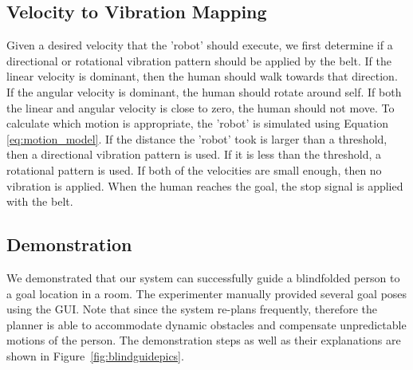 \subsection{Velocity to Vibration Mapping}

Given a desired velocity that the 'robot' should execute, we first determine if a directional or rotational vibration pattern should be applied by the belt. If the linear velocity is dominant, then the human should walk towards that direction. If the angular velocity is dominant, the human should rotate around self. If both the linear and angular velocity is close to zero, the human should not move. To calculate which motion is appropriate, the 'robot' is simulated using Equation \ref{eq:motion_model}. If the distance the 'robot' took is larger than a threshold, then a directional vibration pattern is used. If it is less than the threshold, a rotational pattern is used. If both of the velocities are small enough, then no vibration is applied. When the human reaches the goal, the stop signal is applied with the belt. 

\subsection{Demonstration}

We demonstrated that our system can successfully guide a blindfolded person to a goal location in a room. The experimenter manually provided several goal poses using the GUI. Note that since the system re-plans frequently, therefore the planner is able to accommodate dynamic obstacles and compensate unpredictable motions of the person. The demonstration steps as well as their explanations are shown in Figure~\ref{fig:blindguidepics}.

